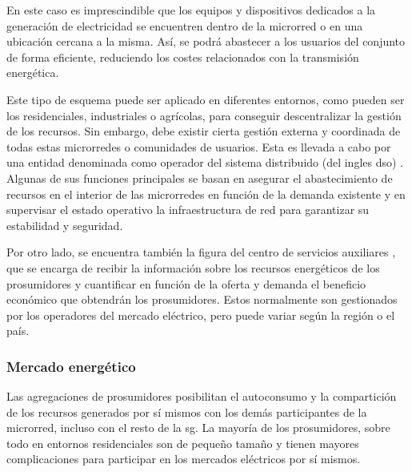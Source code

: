 \vspace{3mm}

En este caso es imprescindible que los equipos y dispositivos dedicados a la generación de electricidad se encuentren dentro de la microrred o en una ubicación cercana a la misma. Así, se podrá abastecer a los usuarios del conjunto de forma eficiente, reduciendo los costes relacionados con la transmisión energética. 

\vspace{3mm}

Este tipo de esquema puede ser aplicado en diferentes entornos, como pueden ser los residenciales, industriales o agrícolas, para conseguir descentralizar la gestión de los recursos. Sin embargo, debe existir cierta gestión externa y coordinada de todas estas microrredes o comunidades de usuarios. Esta es llevada a cabo por una entidad denominada como operador del sistema distribuido (del ingles \gls{dso}) \cite{transactive} \cite{dso}. Algunas de sus funciones principales se basan en asegurar el abastecimiento de recursos en el interior de las microrredes en función de la demanda existente y en supervisar el estado operativo la infraestructura de red para garantizar su estabilidad y seguridad. 

\vspace{3mm}

Por otro lado, se encuentra también la figura del centro de servicios auxiliares \cite{transactive}, que se encarga de recibir la información sobre los recursos energéticos de los prosumidores y cuantificar en función de la oferta y demanda el beneficio económico que obtendrán los prosumidores. Estos normalmente son gestionados por los operadores del mercado eléctrico, pero puede variar según la región o el país.

\vspace{3mm}

\subsubsection{Mercado energético}

Las agregaciones de prosumidores posibilitan el autoconsumo y la compartición de los recursos generados por sí mismos con los demás participantes de la microrred, incluso con el resto de la \gls{sg}. La mayoría de los prosumidores, sobre todo en entornos residenciales son de pequeño tamaño y tienen mayores complicaciones para participar en los mercados eléctricos por sí mismos. 

\vspace{3mm}

